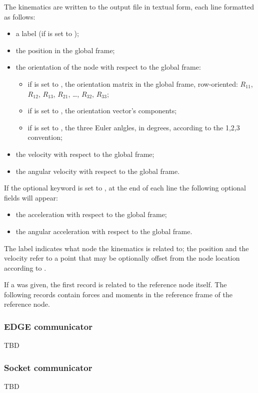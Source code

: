 The kinematics are written to the output file in textual form,
each line formatted as follows:
\begin{itemize}
\item a label (if  is set to );
\item the position in the global frame;
\item the orientation of the node with respect to the global frame:
\begin{itemize}
	\item if  is set to ,
	the orientation matrix in the global frame, row-oriented:
	$R_{11}$, $R_{12}$, $R_{13}$, $R_{21}$, \ldots, $R_{32}$, $R_{33}$;
	\item if  is set to ,
	the orientation vector's components;
	\item if  is set to ,
	the three Euler anlgles, in degrees, according to the 1,2,3
	convention;
\end{itemize}
\item the velocity with respect to the global frame;
\item the angular velocity with respect to the global frame.
\end{itemize}
If the optional keyword  is set to ,
at the end of each line the following optional fields will appear:
\begin{itemize}
\item the acceleration with respect to the global frame;
\item the angular acceleration with respect to the global frame.
\end{itemize}
The label indicates what node the kinematics is related to;
the position and the velocity refer to a point that may be optionally
offset from the node location according to .

If a  was given, the first record is related
to the reference node itself.
The following records contain forces and moments in the reference frame
of the reference node.



\subsubsection{EDGE communicator}
TBD




\subsubsection{Socket communicator}
TBD




